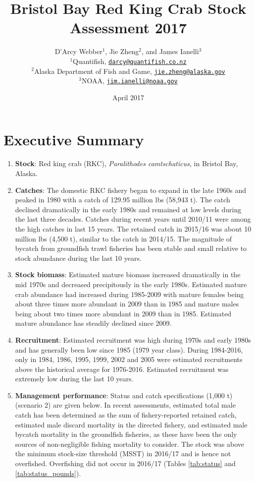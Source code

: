 \documentclass[]{article}
\title{Bristol Bay Red King Crab Stock Assessment 2017}
\author{D'Arcy Webber\(^1\), Jie Zheng\(^2\), and James Ianelli\(^3\)\\
\(^1\)Quantifish,
\href{mailto:darcy@quantifish.co.nz}{\nolinkurl{darcy@quantifish.co.nz}}\\
\(^2\)Alaska Department of Fish and Game,
\href{mailto:jie.zheng@alaska.gov}{\nolinkurl{jie.zheng@alaska.gov}}\\
\(^3\)NOAA,
\href{mailto:jim.ianelli@noaa.gov}{\nolinkurl{jim.ianelli@noaa.gov}}}
\date{April 2017}
\begin{document}
\maketitle

\section{Executive Summary}\label{executive-summary}

\begin{enumerate}
\def\labelenumi{\arabic{enumi}.}
\item
  \textbf{Stock}: Red king crab (RKC), \emph{Paralithodes
  camtschaticus}, in Bristol Bay, Alaska.
\item
  \textbf{Catches}: The domestic RKC fishery began to expand in the late
  1960s and peaked in 1980 with a catch of 129.95 million lbs (58,943
  t). The catch declined dramatically in the early 1980s and remained at
  low levels during the last three decades. Catches during recent years
  until 2010/11 were among the high catches in last 15 years. The
  retained catch in 2015/16 was about 10 million lbs (4,500 t), similar
  to the catch in 2014/15. The magnitude of bycatch from groundfish
  trawl fisheries has been stable and small relative to stock abundance
  during the last 10 years.
\item
  \textbf{Stock biomass}: Estimated mature biomass increased
  dramatically in the mid 1970s and decreased precipitously in the early
  1980s. Estimated mature crab abundance had increased during 1985-2009
  with mature females being about three times more abundant in 2009 than
  in 1985 and mature males being about two times more abundant in 2009
  than in 1985. Estimated mature abundance has steadily declined since
  2009.
\item
  \textbf{Recruitment}: Estimated recruitment was high during 1970s and
  early 1980s and has generally been low since 1985 (1979 year class).
  During 1984-2016, only in 1984, 1986, 1995, 1999, 2002 and 2005 were
  estimated recruitments above the historical average for 1976-2016.
  Estimated recruitment was extremely low during the last 10 years.
\item
  \textbf{Management performance}: Status and catch specifications
  (1,000 t) (scenario 2) are given below. In recent assessments,
  estimated total male catch has been determined as the sum of
  fishery-reported retained catch, estimated male discard mortality in
  the directed fishery, and estimated male bycatch mortality in the
  groundfish fisheries, as these have been the only sources of
  non-negligible fishing mortality to consider. The stock was above the
  minimum stock-size threshold (MSST) in 2016/17 and is hence not
  overfished. Overfishing did not occur in 2016/17 (Tables
  \ref{tab:status} and \ref{tab:status_pounds}).
\end{enumerate}
\end{document}
